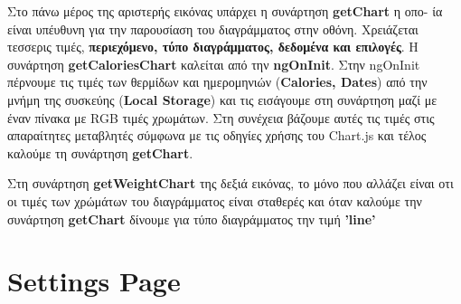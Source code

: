 \documentclass[a4paper,12pt]{article}
\begin{document}
		Στο πάνω μέρος της αριστερής εικόνας υπάρχει η συνάρτηση \textbf{getChart} η οπο-
		ία είναι υπέυθυνη για την παρουσίαση του διαγράμματος στην οθόνη. 
		Χρειάζεται τεσσερις τιμές, \textbf{περιεχόμενο, τύπο διαγράμματος, δεδομένα και επιλογές}. Η συνάρτηση \textbf{getCaloriesChart} καλείται 
		από την \textbf{ngOnInit}. Στην ngOnInit πέρνουμε τις τιμές των θερμίδων και ημερομηνιών (\textbf{Calories, Dates}) από την μνήμη της συσκεύης 
		(\textbf{Local Storage}) και τις εισάγουμε στη συνάρτηση μαζί με έναν πίνακα με RGB τιμές χρωμάτων. 
		Στη συνέχεια βάζουμε αυτές τις τιμές στις απαραίτητες μεταβλητές σύμφωνα με τις οδηγίες χρήσης του Chart.js και τέλος καλούμε τη συνάρτηση 
		\textbf{getChart}.

		Στη συνάρτηση \textbf{getWeightChart} της δεξιά εικόνας, το μόνο που αλλάζει είναι οτι οι τιμές των χρώμάτων του διαγράμματος
		είναι σταθερές και όταν καλούμε την συνάρτηση \textbf{getChart} δίνουμε για τύπο διαγράμματος την τιμή \textbf{'line'}
		\newpage
		\section{Settings Page}	
\end{document}
